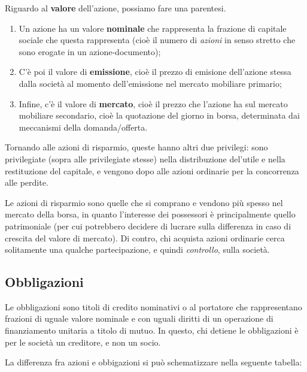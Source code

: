 \documentclass[a4paper,11pt]{article}
\begin{document}
\begin{itemize}
\begin{itemize}
				Riguardo al \textbf{valore} dell'azione, possiamo fare una parentesi.
				\begin{enumerate}
					\item Un azione ha un valore \textbf{nominale} che rappresenta la frazione di capitale sociale che questa rappresenta (cioè il numero di \textit{azioni} in senso stretto che sono erogate in un azione-documento);
					\item C'è poi il valore di \textbf{emissione}, cioè il prezzo di emisione dell'azione stessa dalla società al momento dell'emissione nel mercato mobiliare primario;
					\item Infine, c'è il valore di \textbf{mercato}, cioè il prezzo che l'azione ha sul mercato mobiliare secondario, cioè la quotazione del giorno in borsa, determinata dai meccanismi della domanda/offerta.
				\end{enumerate}

				Tornando alle azioni di risparmio, queste hanno altri due privilegi: sono privilegiate (sopra alle privilegiate stesse) nella distribuzione del'utile e nella restituzione del capitale, e vengono dopo alle azioni ordinarie per la concorrenza alle perdite.

				Le azioni di risparmio sono quelle che si comprano e vendono più spesso nel mercato della borsa, in quanto l'interesse dei possessori è principalmente quello patrimoniale (per cui potrebbero decidere di lucrare sulla differenza in caso di crescita del valore di mercato).
				Di contro, chi acquista azioni ordinarie cerca solitamente una qualche partecipazione, e quindi \textit{controllo}, sulla società. 
		\end{itemize}
\end{itemize}

\subsection{Obbligazioni}
Le obbligazioni sono titoli di credito nominativi o al portatore che rappresentano frazioni di uguale valore nominale e con uguali diritti di un operazione di finanziamento unitaria a titolo di mutuo.
In questo, chi detiene le obbligazioni è per le società un creditore, e non un socio.

La differenza fra azioni e obbigazioni si può schematizzare nella seguente tabella:
\end{document}
